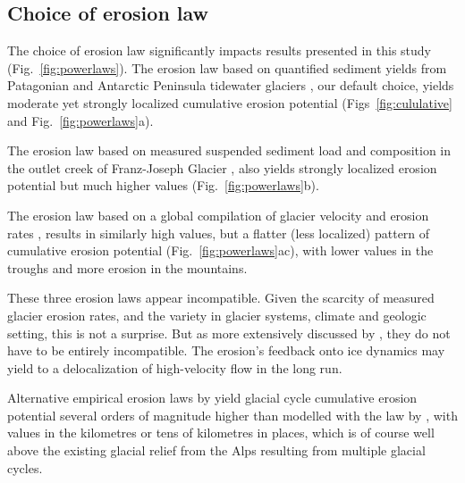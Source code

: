 \documentclass[utf8]{article}
\begin{document}
\subsection{Choice of erosion law}
\label{sec:powerlaws}

    The choice of erosion law significantly impacts results presented in this
    study (Fig.~\ref{fig:powerlaws}). The erosion law based on quantified
    sediment yields from Patagonian and Antarctic Peninsula tidewater glaciers
    \citet[$\dot{e} = 5.2 \times 10^{-8} u_\mathrm{b}^{2.34}$]{Koppes.etal.2015},
    our default choice, yields moderate yet strongly localized cumulative erosion
    potential (Figs~\ref{fig:cululative} and Fig.~\ref{fig:powerlaws}a).

    The erosion law based on measured suspended sediment load and composition
    in the outlet creek of Franz-Joseph Glacier
    \citep[$\dot{e} = 2.7 \times 10^{-7} u_\mathrm{b}^{2.02}$]{Herman.etal.2015},
    also yields strongly localized erosion potential but much higher values
    (Fig.~\ref{fig:powerlaws}b).

    The erosion law based on a global compilation of glacier velocity and erosion
    rates
    \citet[$\dot{e} = 1.665 \times 10^{-1} u_\mathrm{b}^{0.6459}$]{Cook.etal.2020},
    results in similarly high values, but a flatter (less localized) pattern of
    cumulative erosion potential (Fig.~\ref{fig:powerlaws}ac), with lower
    values in the troughs and more erosion in the mountains.

    These three erosion laws appear incompatible. Given the scarcity of measured
    glacier erosion rates, and the variety in glacier systems, climate and
    geologic setting, this is not a surprise.  But as more extensively
    discussed by \citet{Cook.etal.2020}, they do not have to be entirely
    incompatible. The erosion's feedback onto ice dynamics
    may yield to a delocalization of high-velocity flow in the long run.

    Alternative empirical erosion laws by
    \citet{Herman.etal.2015, Cook.etal.2020} yield glacial cycle cumulative
    erosion potential several orders of magnitude higher than modelled with the
    law by \citet{Koppes.etal.2015}, with values in the kilometres or tens of
    kilometres in places, which is of course well above the existing glacial
    relief from the Alps resulting from multiple glacial cycles.
\end{document}
